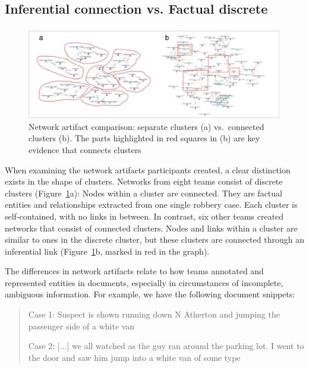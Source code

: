 \subsection{Inferential connection vs. Factual discrete}

\begin{figure}
	\centering
	\includegraphics[width=\columnwidth]{04-Study_one/img/network_cluster.png}
	\caption{Network artifact comparison: separate clusters (a)
		vs.~connected clusters (b). The parts highlighted in red squares in (b) are key
		evidence that connects clusters\label{fig:network_cluster}}
\end{figure}

When examining the network artifacts participants created, a clear distinction exists in the shape of clusters. Networks from eight teams consist of discrete clusters
(Figure~\ref{fig:network_cluster}a): Nodes within a cluster are
connected. They are factual entities and relationships extracted from one single robbery case.  Each cluster is self-contained, with no links in between. In contrast, six other teams created networks that consist of connected clusters. Nodes and links within a cluster are similar to ones in the discrete cluster, but these clusters are connected through an
inferential link (Figure~\ref{fig:network_cluster}b, marked in red in the graph).

The differences in network artifacts relate to how teams annotated and represented entities in documents, especially in circumstances of incomplete, ambiguous information. For example, we have the following document snippets:

\begin{quote}
	Case 1: Suspect is shown running down N Atherton and jumping the passenger side of a white van
	
	Case 2: [...] we all watched as the guy ran around the parking lot. I went to the door and saw him jump into a white van of some type
\end{quote}

